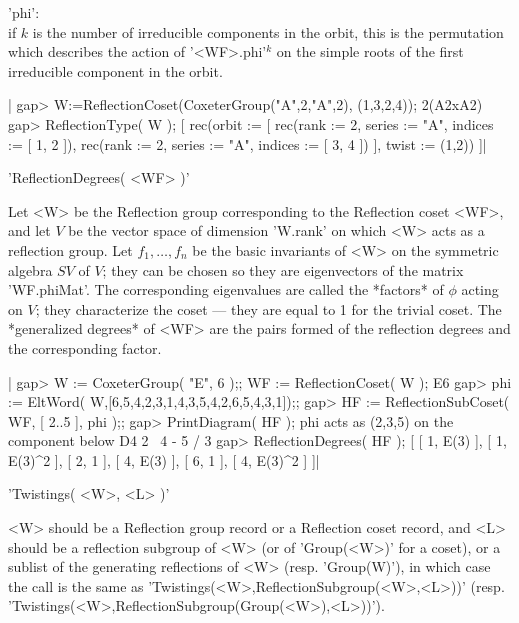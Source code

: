 'phi':\\ if $k$ is the number  of  irreducible  components  in  the  orbit,
   this  is the permutation which describes the action of '<WF>.phi'$^k$ on
   the simple roots of the first irreducible component in the orbit.

|    gap> W:=ReflectionCoset(CoxeterGroup("A",2,"A",2), (1,3,2,4));
    2(A2xA2)
    gap> ReflectionType( W );
    [ rec(orbit := [ rec(rank    := 2,
          series  := "A",
          indices := [ 1, 2 ]), rec(rank    := 2,
          series  := "A",
          indices := [ 3, 4 ]) ],
          twist := (1,2)) ]|


'ReflectionDegrees( <WF> )'

Let <W> be the Reflection group corresponding to the Reflection coset <WF>,
and  let $V$ be the vector space of dimension 'W.rank' on which <W> acts as
a  reflection group. Let $f_1,\ldots,f_n$ be the basic invariants of <W> on
the  symmetric  algebra  $SV$  of  $V$;  they  can  be  chosen  so they are
eigenvectors  of the matrix 'WF.phiMat'.  The corresponding eigenvalues are
called  the *factors* of $\phi$ acting  on $V$; they characterize the coset
--- they are equal to 1 for the trivial coset. The *generalized degrees* of
<WF>  are the pairs formed of  the reflection degrees and the corresponding
factor.

|    gap> W := CoxeterGroup( "E", 6 );; WF := ReflectionCoset( W );
    E6
    gap> phi := EltWord( W,[6,5,4,2,3,1,4,3,5,4,2,6,5,4,3,1]);;
    gap> HF := ReflectionSubCoset( WF, [ 2..5 ], phi );;
    gap> PrintDiagram( HF );
    phi acts as (2,3,5) on the component below
    D4   2
          \
           4 - 5
          /
         3
    gap> ReflectionDegrees( HF );
    [ [ 1, E(3) ], [ 1, E(3)^2 ], [ 2, 1 ], [ 4, E(3) ], [ 6, 1 ],
      [ 4, E(3)^2 ] ]|

\Section{Twistings}

'Twistings( <W>, <L> )'

<W>  should be a Reflection group record  or a Reflection coset record, and
<L> should be a reflection subgroup of <W> (or of 'Group(<W>)' for a coset),
or  a sublist of  the generating reflections  of <W> (resp. 'Group(W)'), in
which case the call is the same as
'Twistings(<W>,ReflectionSubgroup(<W>,<L>))' (resp.
'Twistings(<W>,ReflectionSubgroup(Group(<W>),<L>))').

